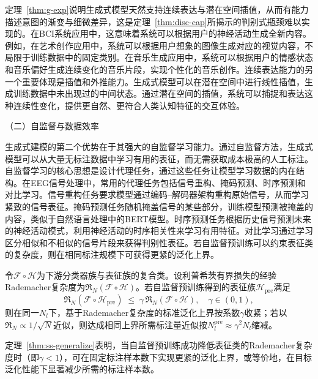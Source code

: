 定理~\ref{thm:g-exp}说明生成式模型天然支持连续表达与潜在空间插值，从而有能力描述意图的渐变与细微差异，这是定理~\ref{thm:disc-cap}所揭示的判别式瓶颈难以实现的。在BCI系统应用中，这意味着系统可以根据用户的神经活动生成全新内容。例如，在艺术创作应用中，系统可以根据用户想象的图像生成对应的视觉内容，不局限于训练数据中的固定类别。在音乐生成应用中，系统可以根据用户的情感状态和音乐偏好生成连续变化的音乐片段，实现个性化的音乐创作。连续表达能力的另一个重要体现是插值和外推能力。生成式模型可以在潜在空间中进行线性插值，生成训练数据中未出现过的中间状态。通过潜在空间的插值，系统可以捕捉和表达这种连续性变化，提供更自然、更符合人类认知特征的交互体验。


（二）自监督与数据效率

生成式建模的第二个优势在于其强大的自监督学习能力。通过自监督方法，生成式模型可以从大量无标注数据中学习有用的表征，而无需获取成本极高的人工标注。
自监督学习的核心思想是设计代理任务，通过这些任务让模型学习数据的内在结构。在EEG信号处理中，常用的代理任务包括信号重构、掩码预测、时序预测和对比学习。信号重构任务要求模型通过编码--解码器架构重构原始信号，从而学习紧致的信号表征。掩码预测任务随机掩盖信号的某些部分，训练模型预测被掩盖的内容，类似于自然语言处理中的BERT模型。时序预测任务根据历史信号预测未来的神经活动模式，利用神经活动的时序相关性来学习有用特征。对比学习通过学习区分相似和不相似的信号片段来获得判别性表征。若自监督预训练可以约束表征类的复杂度，则在相同标注规模下可获得更紧的泛化上界。

\begin{theorem}
\label{thm:ss-generalize}
令$\mathcal{F}\circ\mathcal{H}$为下游分类器族与表征族的复合类。设利普希茨有界损失的经验Rademacher复杂度为$\mathfrak{R}_N(\mathcal{F}\circ\mathcal{H})$。若自监督预训练得到的表征族$\mathcal{H}_{\text{pre}}$满足
\begin{equation}
\label{eq:rademacher-reduce}
\mathfrak{R}_N(\mathcal{F}\circ\mathcal{H}_{\text{pre}}) \;\le\; \gamma \,\mathfrak{R}_N(\mathcal{F}\circ\mathcal{H}), \quad \gamma\in(0,1),
\end{equation}
则在同一$N_l$下，基于Rademacher复杂度的标准泛化上界按系数$\gamma$收紧；若以$\mathfrak{R}_N\!\propto\! 1/\sqrt{N}$近似，则达成相同上界所需标注量近似按$N_l^{\text{pre}} \approx \gamma^{2} N_l$缩减。
\end{theorem}

定理~\ref{thm:ss-generalize}表明，当自监督预训练成功降低表征类的Rademacher复杂度时（即$\gamma<1$），可在固定标注样本数下实现更紧的泛化上界，或等价地，在目标泛化性能下显著减少所需的标注样本数。

